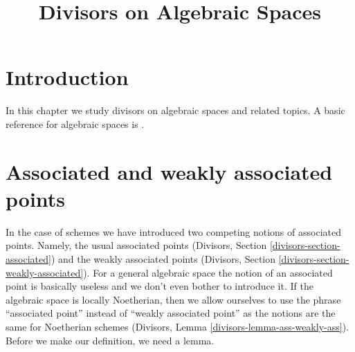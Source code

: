 

%


\title{Divisors on Algebraic Spaces}


\maketitle

\label{section-phantom}

\tableofcontents

\section{Introduction}
\label{section-introduction}

\noindent
In this chapter we study divisors on algebraic spaces and related topics.
A basic reference for algebraic spaces is \cite{Kn}.









\section{Associated and weakly associated points}
\label{section-associated}

\noindent
In the case of schemes we have introduced two competing notions
of associated points. Namely, the usual associated points
(Divisors, Section \ref{divisors-section-associated})
and the weakly associated points
(Divisors, Section \ref{divisors-section-weakly-associated}).
For a general algebraic space the notion of an associated point
is basically useless and we don't even bother to introduce it.
If the algebraic space is locally Noetherian, then we allow ourselves
to use the phrase ``associated point'' instead of
``weakly associated point'' as the notions are the same for
Noetherian schemes (Divisors, Lemma \ref{divisors-lemma-ass-weakly-ass}).
Before we make our definition, we need a lemma.

